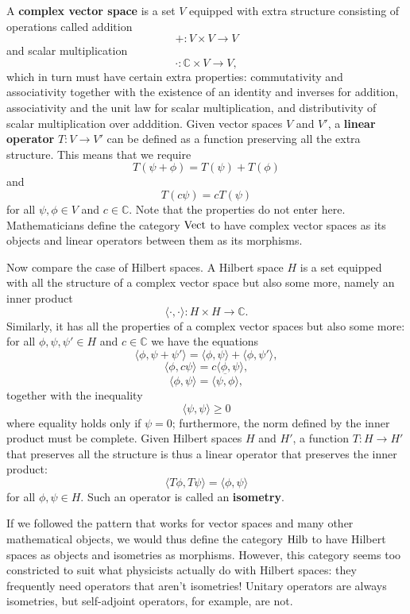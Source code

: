 \documentclass[12pt]{article}
\newcommand{\Hilb}{{\rm Hilb}}
\newcommand{\Vect}{{\rm Vect}}
\newcommand{\C}{{\mathbb C}}
\renewcommand{\to}{\rightarrow}
\newcommand{\maps}{\colon}
\begin{document}
A {\bf complex vector space} is a set $V$ equipped with 
extra structure consisting of operations called addition
\[              + \maps V \times V \to V  \]
and scalar multiplication
\[              \cdot \maps \C \times V \to V ,\]
which in turn must have certain extra properties: commutativity
and associativity together with the existence of an 
identity and inverses for addition, associativity and the unit law for 
scalar multiplication, and distributivity of scalar multiplication
over adddition.   Given vector spaces $V$ and $V'$, a
{\bf linear operator} $T \maps V \to V'$ can be defined as 
a function preserving all the extra structure.  This means
that we require 
\[     T(\psi + \phi) = T(\psi) + T(\phi) \]
and 
\[        T(c\psi) = c T(\psi)  \]
for all $\psi,\phi \in V$ and $c \in \C$.  Note that the 
properties do not enter here.  Mathematicians
define the category $\Vect$ to have complex vector spaces 
as its objects and linear operators between them as its
morphisms.

Now compare the case of Hilbert spaces.  A Hilbert space $H$
is a set equipped with all the structure of a complex vector
space but also some more, namely an inner product
\[        \langle \cdot, \cdot \rangle \maps H \times H \to \C . \]
Similarly, it has all the properties of a complex vector spaces
but also some more: for all $\phi, \psi, \psi' \in H$
and $c \in \C$ we have the equations
\[    \langle \phi , \psi + \psi' \rangle = 
       \langle \phi, \psi \rangle + \langle \phi, \psi' \rangle, \]
\[   \langle \phi, c\psi \rangle = c \langle \phi, \psi \rangle, \]
\[   \langle \phi,\psi \rangle = \overline{\langle \psi,\phi \rangle},\]
together with the inequality
\[   \langle \psi , \psi \rangle \ge 0 \]
where equality holds only if $\psi = 0$; furthermore, the norm defined
by the inner product must be complete.  
Given Hilbert spaces $H$ and $H'$, a function $T \maps H \to H'$
that preserves all the structure is thus a linear operator that 
preserves the inner product:
\[      \langle T \phi, T \psi \rangle = \langle \phi,\psi \rangle \]
for all $\phi,\psi \in H$.  Such an operator is called an 
{\bf isometry}.    

If we followed the pattern that works for vector spaces 
and many other mathematical objects, we would thus define the
category $\Hilb$ to have Hilbert spaces as objects and 
isometries as morphisms.  However, this category seems
too constricted to suit what physicists actually do
with Hilbert spaces: they frequently need operators
that aren't isometries!   Unitary operators are always 
isometries, but self-adjoint operators, for example, are not.
\end{document}
